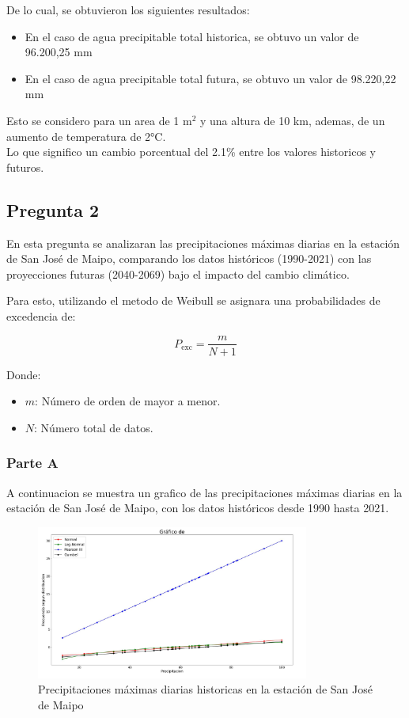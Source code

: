 \documentclass{article}  %
\begin{document}
\vspace{1.5cm}

De lo cual, se obtuvieron los siguientes resultados:

\begin{itemize}
    \item En el caso de agua precipitable total historica, se obtuvo un valor de 96.200,25 mm 
    \item En el caso de agua precipitable total futura, se obtuvo un valor de 98.220,22 mm
\end{itemize}
Esto se considero para un area de 1 m$^2$ y una altura de 10 km, ademas, de un aumento de temperatura de 2°C. \\
Lo que significo un cambio porcentual del 2.1\% entre los valores historicos y futuros.

\newpage
\subsection{Pregunta 2}

En esta pregunta se analizaran las precipitaciones máximas diarias en la estación de San José de Maipo, comparando los datos históricos (1990-2021) con las proyecciones futuras (2040-2069) bajo el impacto del cambio climático.

Para esto, utilizando el metodo de Weibull se asignara una probabilidades de excedencia de: 

\begin{equation}
  P_{\text{exc}} = \frac{m}{N + 1}
  \end{equation}
  
  Donde:
  \begin{itemize}
      \item $m$: Número de orden de mayor a menor.
      \item $N$: Número total de datos.
  \end{itemize}

\subsubsection{Parte A}

A continuacion se muestra un grafico de las precipitaciones máximas diarias en la estación de San José de Maipo, con los datos históricos desde 1990 hasta 2021.

\begin{figure}[H]
    \centering
    \includegraphics[width=0.8\textwidth]{grafico.jpg}
    \caption{Precipitaciones máximas diarias historicas en la estación de San José de Maipo}
    \label{fig:precipitaciones_maximas_diarias}
\end{figure}
\end{document}

